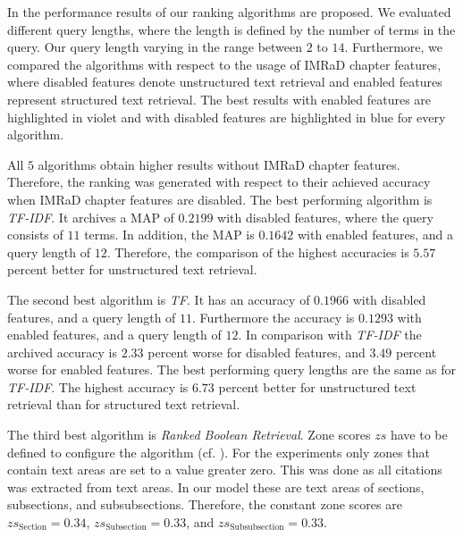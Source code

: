 In  the performance results of our ranking algorithms are proposed. We evaluated different query lengths, where the length is defined by the number of terms in the query. Our query length varying in the range between $2$ to $14$. Furthermore, we compared the algorithms with respect to the usage of IMRaD chapter features, where disabled features denote unstructured text retrieval and enabled features represent structured text retrieval. The best results with enabled features are highlighted in violet and with disabled features are highlighted in blue for every algorithm.

All $5$ algorithms obtain higher results without IMRaD chapter features. Therefore, the ranking was generated with respect to their achieved accuracy when IMRaD chapter features are disabled. The best performing algorithm is \textit{TF-IDF}. It archives a MAP of $0.2199$ with disabled features, where the query consists of $11$ terms. In addition, the MAP is $0.1642$ with enabled features, and a query length of $12$. Therefore, the comparison of the highest accuracies is $5.57$ percent better for unstructured text retrieval. 

The second best algorithm is \textit{TF}. It has an accuracy of $0.1966$ with disabled features, and a query length of $11$. Furthermore the accuracy is $0.1293$ with enabled features, and a query length of $12$. In comparison with \textit{TF-IDF} the archived accuracy is $2.33$ percent worse for disabled features, and $3.49$ percent worse for enabled features. The best performing query lengths are the same as for \textit{TF-IDF}. The highest accuracy is $6.73$ percent better for unstructured text retrieval than for structured text retrieval.

The third best algorithm is \textit{Ranked Boolean Retrieval}. Zone scores $zs$ have to be defined to configure the algorithm (cf. ). For the experiments only zones that contain text areas are set to a value greater zero. This was done as all citations was extracted from text areas. In our model these are text areas of sections, subsections, and subsubsections. Therefore, the constant zone scores are $zs_{\text{Section}} = 0.34$, $zs_{\text{Subsection}} = 0.33$, and $zs_{\text{Subsubsection}} = 0.33$.

